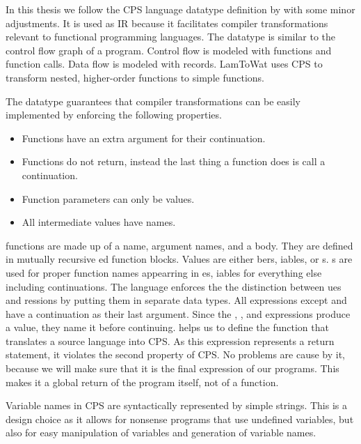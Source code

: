 In this thesis we follow the \ac{CPS} language datatype definition by \citeauthor{DBLP:books/daglib/0022396} with some minor adjustments. It is used as \ac{IR} because it facilitates compiler transformations relevant to functional programming languages. The datatype is similar to the control flow graph of a program. Control flow is modeled with functions and function calls. Data flow is modeled with records. LamToWat uses \ac{CPS} to transform nested, higher-order functions to simple functions.

The  datatype guarantees that compiler transformations can be easily implemented by enforcing the following properties.

\begin{itemize}
\item Functions have an extra argument for their continuation.
\item Functions do not return, instead the last thing a function does is call a continuation.
\item Function parameters can only be values.
\item All intermediate values have names.
\end{itemize}

 functions are made up of a name, argument names, and a body. They are defined in mutually recursive ed function blocks. Values are either bers, iables, or s. s are used for proper function names appearring in es, iables for everything else including continuations. The  language enforces the the distinction between ues and ressions by putting them in separate data types. All expressions except  and  have a continuation as their last argument. Since the , , and  expressions produce a value, they name it before continuing.  helps us to define the function that translates a source language into \ac{CPS}. As this expression represents a return statement, it violates the second property of \ac{CPS}. No problems are cause by it, because we will make sure that it is the final expression of our programs. This makes it a global return of the program itself, not of a function.

Variable names in \ac{CPS} are syntactically represented by simple strings. This is a design choice as it allows for nonsense programs that use undefined variables, but also for easy manipulation of variables and generation of variable names.

